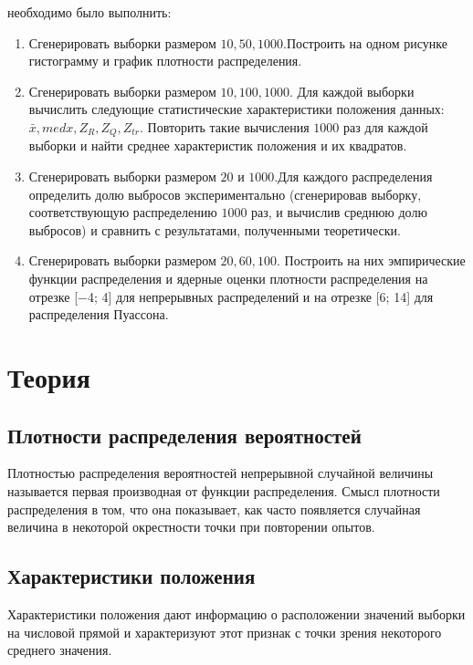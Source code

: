 \documentclass[a4]{article}
\begin{document}
необходимо было выполнить:
\begin{enumerate}
    \item Сгенерировать выборки размером $ 10,50,1000 $.Построить на одном рисунке гистограмму и график плотности распределения.
    \item  Сгенерировать выборки размером $ 10,100,1000 $. Для каждой выборки вычислить следующие статистические характеристики положения данных: $ \bar{x}, med x, Z_{R},Z_{Q},Z_{tr} $. Повторить такие
    вычисления $1000$ раз для каждой выборки и найти среднее характеристик положения и их квадратов.
    \item Сгенерировать выборки размером $ 20 $ и $1000 $.Для каждого распределения определить долю выбросов экспериментально (сгенерировав выборку, соответствующую распределению $1000$
    раз, и вычислив среднюю долю выбросов) и сравнить с результатами,
    полученными теоретически.
    \item Сгенерировать выборки размером $ 20,60,100 $.	Построить на них эмпирические функции распределения и ядерные оценки плотности распределения на отрезке [−4; 4] для непрерывных
    распределений и на отрезке [6; 14] для распределения Пуассона.
\end{enumerate}



\section{Теория}
\subsection{Плотности распределения вероятностей}

Плотностью распределения вероятностей непрерывной случайной величины называется первая производная от функции распределения. Смысл плотности распределения в том, что она показывает, как часто появляется случайная величина в некоторой окрестности точки при повторении опытов.

\subsection{Характеристики положения}
Характеристики положения дают информацию о расположении значений выборки на числовой прямой и характеризуют этот признак с точки зрения некоторого среднего значения.
\end{document}
